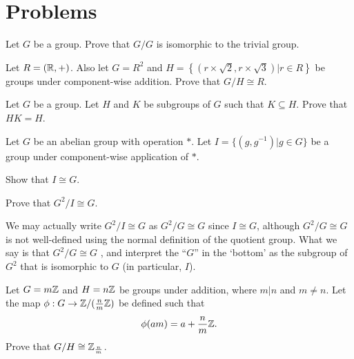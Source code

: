\section{Problems}
\begin{problem}
    Let $G$ be a group. Prove that $G/G$ is isomorphic to the trivial group.
\end{problem}

\begin{problem}
    Let $R = (\mathbb{R}, +)$. Also let $G = R^2$ and $H = \left\{(r\times\sqrt2, r\times\sqrt3) \vert r\in R\right\}$ be groups under component-wise addition. Prove that $G/H \cong R$.
\end{problem}

\begin{problem}\label{problem-subgroup-product-equal-to-subgroup-if-one-is-subgroup-of-another}
    Let $G$ be a group. Let $H$ and $K$ be subgroups of $G$ such that $K \subseteq H$. Prove that $HK = H$.
\end{problem}

\begin{problem}\label{problem-cartesian-product-of-group-by-group-isomorphic-to-group}
    Let $G$ be an abelian group with operation $\ast$. Let $I = \{(g, g^{-1}) \vert g \in G\}$ be a group under component-wise application of $\ast$.
    \begin{partquestions}{\alph*}
        \item Show that $I \cong G$.
        \item Prove that $G^2/I \cong G$.
    \end{partquestions}
\end{problem}
\begin{remark}
    We may actually write $G^2/I \cong G$ as $G^2/G \cong G$ since $I \cong G$, although $G^2/G \cong G$ is not well-defined using the normal definition of the quotient group. What we say is that $G^2/G \cong G$ , and interpret the ``$G$'' in the `bottom' as the subgroup of $G^2$ that is isomorphic to $G$ (in particular, $I$).
\end{remark}

\begin{problem}\label{problem-mZ/nZ-isomorphic-to-Zn/m}
    Let $G = m\mathbb{Z}$ and $H = n\mathbb{Z}$ be groups under addition, where $m\vert n$ and $m \neq n$. Let the map $\phi: G \to \mathbb{Z}/({\frac nm}\mathbb{Z})$ be defined such that
    \[
        \phi(am) = a + \frac nm \mathbb{Z}.
    \]
    Prove that $G/H \cong \mathbb{Z}_{\frac nm}$.
\end{problem}
